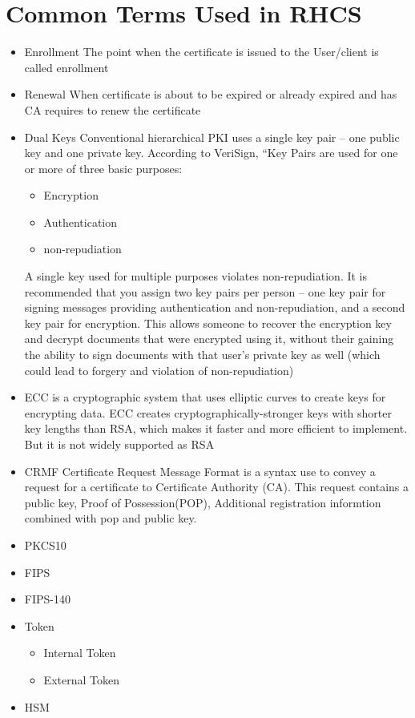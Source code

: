 \documentclass[a4paper]{article}
\begin{document}
\section{Common Terms Used in RHCS}
\begin{itemize}
    \item Enrollment
        The point when the certificate is issued to the User/client is called enrollment
    \item Renewal
        When certificate is about to be expired or already expired and has CA requires to 
        renew the certificate
    \item Dual Keys
        Conventional hierarchical PKI uses a single key pair – one public key and one
        private key. According to VeriSign, “Key Pairs are used for one or more of three basic purposes:
        \begin{itemize}
            \item Encryption
            \item Authentication
            \item non-repudiation
        \end{itemize}
         A single key used for multiple purposes violates non-repudiation.
         It is recommended that you assign two key pairs per person -- one key pair for signing messages 
         providing authentication and non-repudiation, and a second key pair for encryption. 
         This allows someone to recover the encryption key and decrypt documents that were encrypted using it,
         without their gaining the ability to sign documents with that user’s private key as well (which
         could lead to forgery and violation of non-repudiation)
    \item ECC
        is a cryptographic system that uses elliptic curves to create keys for encrypting data. 
        ECC creates cryptographically-stronger keys with shorter key lengths  than RSA, which makes it faster 
        and more efficient to implement. But it is not widely supported as RSA
    \item CRMF
        Certificate Request Message Format is a syntax use to convey a request for a certificate to Certificate
        Authority (CA). This request contains a public key, Proof of Possession(POP), Additional registration informtion
        combined with pop and public key.\cite{4211}
    \item PKCS10
    \item FIPS
    \item FIPS-140
    \item Token
        \begin{itemize}
            \item Internal Token
            \item External Token
        \end{itemize}
    \item HSM
\end{itemize}
\end{document}
